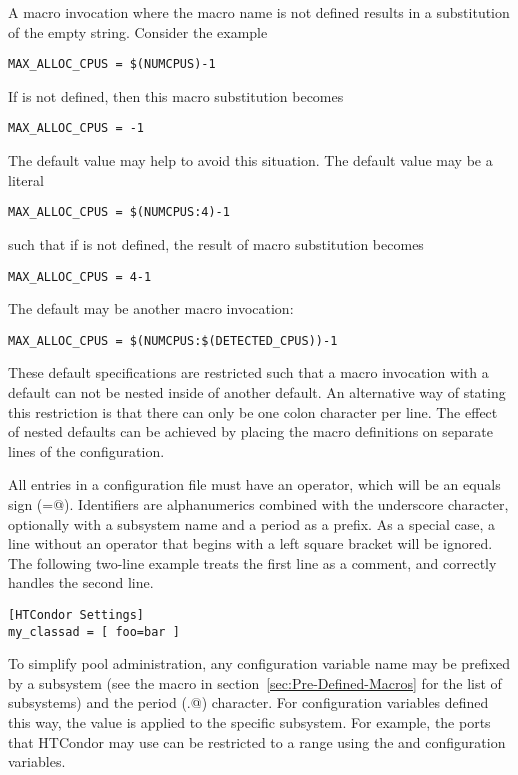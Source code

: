 A macro invocation where the macro name is not defined results
in a substitution of the empty string.
Consider the example
\begin{verbatim}
MAX_ALLOC_CPUS = $(NUMCPUS)-1
\end{verbatim}
If  is not defined, then this macro substitution
becomes
\begin{verbatim}
MAX_ALLOC_CPUS = -1
\end{verbatim}
The default value may help to avoid this situation.
The default value may be a literal
\begin{verbatim}
MAX_ALLOC_CPUS = $(NUMCPUS:4)-1
\end{verbatim}
such that if  is not defined, the result of macro
substitution becomes
\begin{verbatim}
MAX_ALLOC_CPUS = 4-1
\end{verbatim}
The default may be another macro invocation:
\begin{verbatim}
MAX_ALLOC_CPUS = $(NUMCPUS:$(DETECTED_CPUS))-1
\end{verbatim}
These default specifications are restricted such that 
a macro invocation with a default can not be nested inside of another default.  
An alternative way of stating this restriction is that there can
only be one colon character per line. 
The effect of nested defaults can be achieved by placing the
macro definitions on separate lines of the configuration.

All entries in a configuration file must have an operator,
which will be an equals sign (\verb@=@).
Identifiers are alphanumerics combined with the underscore character,
optionally with a subsystem name and a period as a prefix.
As a special case,
a line without an operator that begins with a left square bracket
will be ignored.
The following two-line example treats the first line as a comment,
and correctly handles the second line.
\begin{verbatim}
[HTCondor Settings]
my_classad = [ foo=bar ]
\end{verbatim}

To simplify pool administration,
any configuration variable name may be prefixed by
a subsystem 
(see the  macro in 
section~\ref{sec:Pre-Defined-Macros}
for the list of subsystems)
and the period (\verb@.@) character.
For configuration variables defined this way,
the value is applied to the specific subsystem.
For example,
the ports that HTCondor may use can be restricted to a range 
using the  and  configuration
variables.

